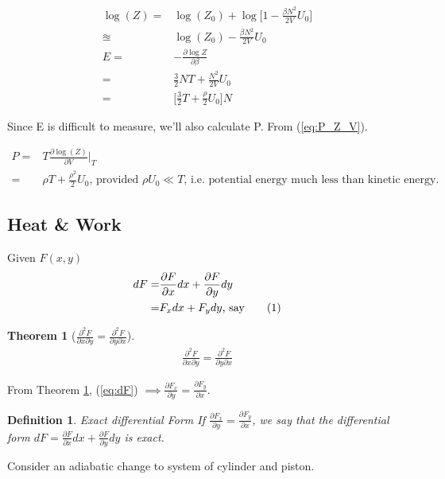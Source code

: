 \documentclass[]{article}
\newcommand\numberthis{\addtocounter{equation}{1}\tag{\theequation}}
\newtheorem{defn}{Definition}
\newtheorem{thm}{Theorem}
\begin{document}
\begin{align*}
\log(Z) =& \log(Z_0) + \log\Big[1 - \frac{\beta N^2}{2V} U_0\Big] \\
\approxeq & \log(Z_0) - \frac{\beta N^2}{2V} U_0\\
E =& - \frac{\partial \log Z}{\partial \beta}\\
=& \frac{3}{2}NT + \frac{N^2}{2V}U_0\\
=& \Big[\frac{3}{2}T + \frac{ \rho}{2}U_0\Big] N
\end{align*}

Since E is difficult to measure, we'll also calculate P. From (\ref{eq:P_Z_V}).

\begin{align*}
P =& T \frac{\partial \log(Z)}{\partial V}\bigg|_T\\
=& \rho T + \frac{\rho^2}{2} U_0\text{, provided $\rho U_0 \ll T$, i.e. potential energy much less than kinetic energy.}
\end{align*}

\subsection{Heat \& Work}

Given $F(x,y)$
\begin{align*}
dF =& \frac{\partial F}{\partial x}dx + \frac{\partial F}{\partial y}dy\\
=& F_x dx + F_y dy\text{, say}\numberthis \label{eq:dF}
\end{align*}

\begin{thm}[$\frac{\partial^2 F}{\partial x \partial y} = \frac{\partial^2 F}{\partial y \partial x}$]\label{thm:2partial}
	\begin{align*}
	\frac{\partial^2 F}{\partial x \partial y} = \frac{\partial^2 F}{\partial y \partial x}
	\end{align*}
\end{thm}

From Theorem \ref{thm:2partial}, (\ref{eq:dF}) $\implies \frac{\partial F_x}{\partial y} = \frac{\partial F_y}{\partial x}$.

\begin{defn}{Exact differential Form}
	If $\frac{\partial F_x}{\partial y} = \frac{\partial F_y}{\partial x}$, we say that the differential form $dF = \frac{\partial F}{\partial x}dx + \frac{\partial F}{\partial y}dy$ is exact.
\end{defn}

Consider an adiabatic change to system of cylinder and piston.
\end{document}
